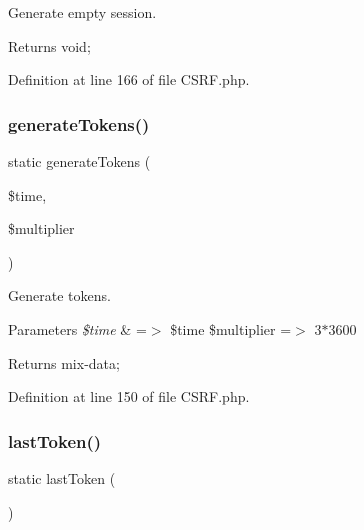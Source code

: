 Generate empty session.

\begin{DoxyReturn}{Returns}
void; 
\end{DoxyReturn}


Definition at line 166 of file C\+S\+R\+F.\+php.

\mbox{\label{class_zest_1_1_c_s_r_f_1_1_c_s_r_f_aaa90673f6609f67f97a05bad95d078ee}} 
\subsubsection{\texorpdfstring{generate\+Tokens()}{generateTokens()}}
{\footnotesize\ttfamily static generate\+Tokens (\begin{DoxyParamCaption}\item[{}]{\$time,  }\item[{}]{\$multiplier }\end{DoxyParamCaption})\hspace{0.3cm}{\ttfamily [static]}}

Generate tokens.


\begin{DoxyParams}{Parameters}
{\em \$time} & =$>$ \$time \$multiplier =$>$ 3$\ast$3600\\
\hline
\end{DoxyParams}
\begin{DoxyReturn}{Returns}
mix-\/data; 
\end{DoxyReturn}


Definition at line 150 of file C\+S\+R\+F.\+php.

\mbox{\label{class_zest_1_1_c_s_r_f_1_1_c_s_r_f_a5c5700df3bc7ab94e9001ffe92672ab8}} 
\subsubsection{\texorpdfstring{last\+Token()}{lastToken()}}
{\footnotesize\ttfamily static last\+Token (\begin{DoxyParamCaption}{ }\end{DoxyParamCaption})\hspace{0.3cm}{\ttfamily [static]}}


